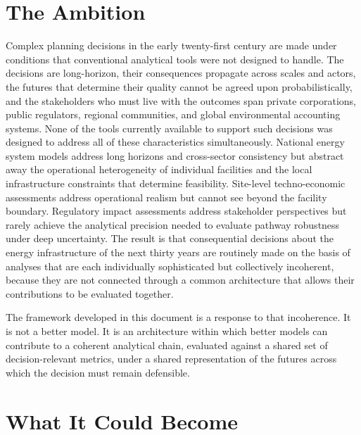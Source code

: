 \documentclass[
  11pt,
  a4paper,
  twoside,
  openright]{scrbook}
\begin{document}
\section{The Ambition}\label{the-ambition}

Complex planning decisions in the early twenty-first century are made
under conditions that conventional analytical tools were not designed to
handle. The decisions are long-horizon, their consequences propagate
across scales and actors, the futures that determine their quality
cannot be agreed upon probabilistically, and the stakeholders who must
live with the outcomes span private corporations, public regulators,
regional communities, and global environmental accounting systems. None
of the tools currently available to support such decisions was designed
to address all of these characteristics simultaneously. National energy
system models address long horizons and cross-sector consistency but
abstract away the operational heterogeneity of individual facilities and
the local infrastructure constraints that determine feasibility.
Site-level techno-economic assessments address operational realism but
cannot see beyond the facility boundary. Regulatory impact assessments
address stakeholder perspectives but rarely achieve the analytical
precision needed to evaluate pathway robustness under deep uncertainty.
The result is that consequential decisions about the energy
infrastructure of the next thirty years are routinely made on the basis
of analyses that are each individually sophisticated but collectively
incoherent, because they are not connected through a common architecture
that allows their contributions to be evaluated together.

The framework developed in this document is a response to that
incoherence. It is not a better model. It is an architecture within
which better models can contribute to a coherent analytical chain,
evaluated against a shared set of decision-relevant metrics, under a
shared representation of the futures across which the decision must
remain defensible.

\section{What It Could Become}\label{what-it-could-become}
\end{document}
